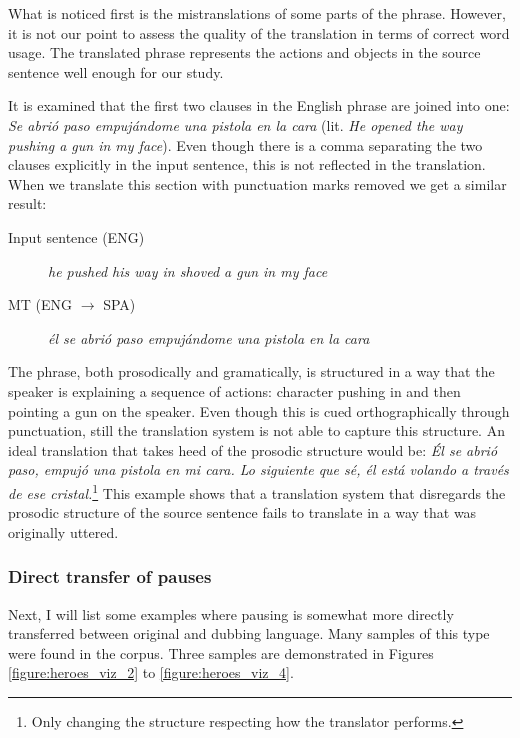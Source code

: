What is noticed first is the mistranslations of some parts of the phrase. However, it is not our point to assess the quality of the translation in terms of correct word usage. The translated phrase represents the actions and objects in the source sentence well enough for our study. 

It is examined that the first two clauses in the English phrase are joined into one: \textit{Se abrió paso empujándome una pistola en la cara} (lit. \textit{He opened the way pushing a gun in my face}). Even though there is a comma separating the two clauses explicitly in the input sentence, this is not reflected in the translation. When we translate this section with punctuation marks removed we get a similar result:

\begin{description}
\item [Input sentence (ENG)] {\it he pushed his way in shoved a gun in my face} 
\item [MT (ENG $\rightarrow$ SPA)] {\it él se abrió paso empujándome una pistola en la cara}
\end{description}

The phrase, both prosodically and gramatically, is structured in a way that the speaker is explaining a sequence of actions: character pushing in and then pointing a gun on the speaker. Even though this is cued orthographically through punctuation, still the translation system is not able to capture this structure. An ideal translation that takes heed of the prosodic structure would be:
\textit{Él se abrió paso, empujó una pistola en mi cara. Lo siguiente que sé, él está volando a través de ese cristal.}\footnote{Only changing the structure respecting how the translator performs.} This example shows that a translation system that disregards the prosodic structure of the source sentence fails to translate in a way that was originally uttered. 

\subsubsection{Direct transfer of pauses}
Next, I will list some examples where pausing is somewhat more directly transferred between original and dubbing language. Many samples of this type were found in the corpus. Three samples are demonstrated in Figures \ref{figure:heroes_viz_2} to \ref{figure:heroes_viz_4}. 

